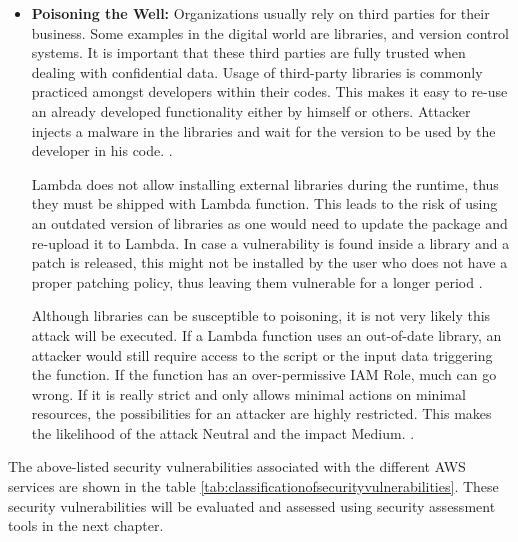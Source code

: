 \begin{itemize}
    \item \textbf{Poisoning the Well:} Organizations usually rely on third parties for their business.
    Some examples
    in the
    digital world are libraries, and version control systems.
    It is important that
    these third parties are fully trusted when dealing with confidential data.
    Usage of third-party libraries is
    commonly practiced amongst developers within their codes.
    This makes it easy to re-use an already developed
    functionality either by himself or others.
    Attacker injects a malware in the libraries and wait for the version to be used by the developer in his code.
    \cite{71}.

    Lambda does not allow installing external libraries
    during the runtime, thus they must be shipped with Lambda function.
    This leads to the risk of using an outdated version of libraries as one would need to update the package and re-upload it to Lambda.
    In case a vulnerability is found inside a library and a patch is released, this might not be installed by the
    user who does not have a proper patching policy, thus
    leaving them vulnerable for a longer period \cite{72}.

    Although libraries can be susceptible to poisoning, it is not very likely this attack will be executed.
    If a Lambda function uses an out-of-date library, an attacker would still require access to the script or the input data triggering the function.
    If the function has an over-permissive IAM Role, much can go wrong.
    If it is really strict and only allows minimal actions on minimal resources, the possibilities for an attacker are highly restricted.
    This makes the likelihood of the attack Neutral and the impact Medium. \cite{64}.
\end{itemize}

\par The above-listed security vulnerabilities associated
with the different AWS services are shown in the table
\ref{tab:classificationofsecurityvulnerabilities}.
These
security vulnerabilities will be evaluated and assessed
using security
assessment tools in the next chapter.

\clearpage

